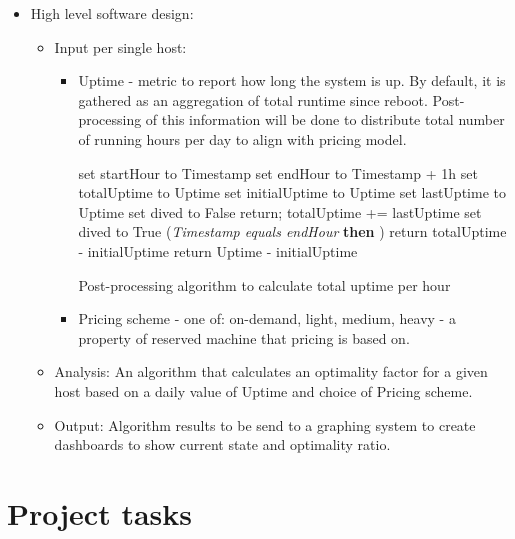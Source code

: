 \documentclass[11pt]{artikel3}
\begin{document}
\begin{itemize}
\item High level software design:
\begin{itemize}
\item Input per single host: 
	\begin{itemize}
	\item Uptime - metric to report how long the system is up. By default, it is gathered as an aggregation of total runtime since reboot. Post-processing of this information will be done to distribute total number of running hours per day to align with pricing model.

	\begin{algorithm}[H]
 		 {
 			set startHour to Timestamp\;
 			set endHour to Timestamp + 1h\;
 			set totalUptime to Uptime\;
 			set initialUptime to Uptime\;
 			set lastUptime to Uptime\;
 			set dived to False\;
 			return;
 		}
 		 {
 			 {
 				totalUptime += lastUptime\;
 				set dived to True\;
 			}
 		} (\textsl{Timestamp equals endHour} \textbf{then} ) 
 		{
 			 {
 				return totalUptime - initialUptime\;
 				}
 			{
 			return Uptime - initialUptime\;
 			}
 		}
 \caption{Post-processing algorithm to calculate total uptime per hour}
\end{algorithm}

	\item Pricing scheme - one of: on-demand, light, medium, heavy - a property of reserved machine that pricing is based on.
	\end{itemize}
\item Analysis: An algorithm that calculates an optimality factor for a given host based on a daily value of Uptime and choice of Pricing scheme.
\item Output: Algorithm results to be send to a graphing system to create dashboards to show current state and optimality ratio.
\end{itemize}
\end{itemize}

\section{Project tasks}
\end{document}
